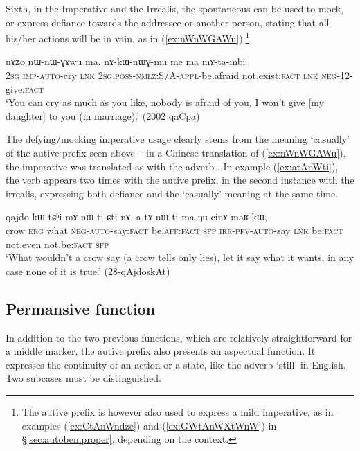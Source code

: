 Sixth, in the Imperative and the Irrealis, the spontaneous can be used to mock, or express defiance towards the addressee or another person, stating that all his/her actions will be in vain, as in (\ref{ex:nWnWGAWu}).\footnote{The autive prefix is however also used to express a mild imperative, as in examples (\ref{ex:CtAnWndze}) and (\ref{ex:GWtAnWXtWnW}) in §\ref{sec:autoben.proper}, depending on the context. }

\begin{exe}
\ex \label{ex:nWnWGAWu}
\gll  nɤʑo nɯ-nɯ-ɣɤwu ma, nɤ-kɯ-nɯɣ-mu me ma mɤ-ta-mbi \\
\textsc{2sg} \textsc{imp}-\textsc{auto}-cry \textsc{lnk} \textsc{2sg}.\textsc{poss}-\textsc{nmlz}:S/A-\textsc{appl}-be.afraid not.exist:\textsc{fact} \textsc{lnk} \textsc{neg}-1\fl{}2-give:\textsc{fact} \\
\glt `You can cry as much as you like, nobody is afraid of you, I won't give [my daughter] to you (in marriage).' (2002 qaCpa)
\end{exe}

The defying/mocking imperative usage clearly stems from the meaning `casually' of the autive prefix seen above -- in a Chinese translation of (\ref{ex:nWnWGAWu}), the imperative  was translated as  with the adverb . In example (\ref{ex:atAnWti}), the verb  appears two times with the autive prefix, in the second instance with the irrealis, expressing both defiance and the `casually' meaning at the same time.

\begin{exe}
\ex \label{ex:atAnWti}
\gll  qajdo kɯ tɕʰi mɤ-nɯ-ti ɕti nɤ, a-tɤ-nɯ-ti ma ŋu cinɤ maʁ kɯ, \\
crow \textsc{erg} what \textsc{neg}-\textsc{auto}-say:\textsc{fact} be.\textsc{aff}:\textsc{fact} \textsc{sfp} \textsc{irr}-\textsc{pfv}-\textsc{auto}-say \textsc{lnk} be:\textsc{fact} not.even not.be:\textsc{fact} \textsc{sfp} \\
\glt `What wouldn't a crow say (a crow tells only lies), let it say what it wants, in any case none of it is true.'  (28-qAjdoskAt)
\end{exe}
 
\subsection{Permansive function}  \label{sec:autoben.permansive}
In addition to the two previous functions, which are relatively straightforward for a middle marker, the autive prefix also presents an aspectual function. It expresses the continuity of an action or a state, like the adverb `still' in English. Two subcases must be distinguished.

